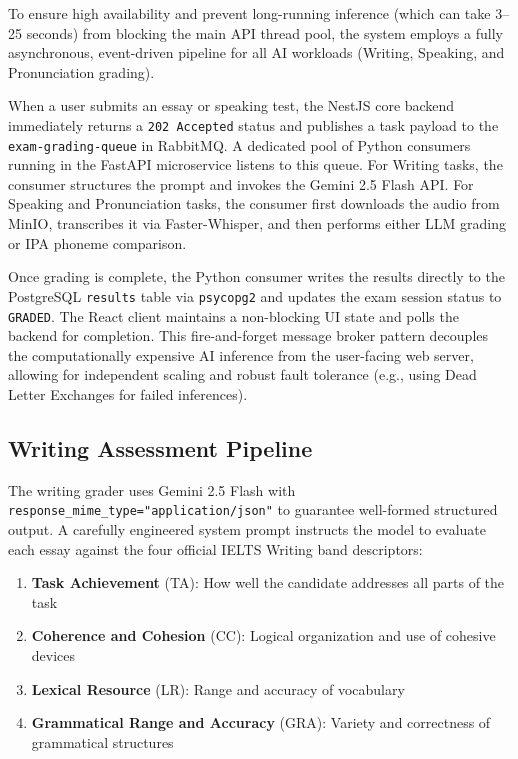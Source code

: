 \documentclass[conference]{IEEEtran}
\begin{document}
To ensure high availability and prevent long-running inference (which can take 3--25 seconds) from blocking the main API thread pool, the system employs a fully asynchronous, event-driven pipeline for all AI workloads (Writing, Speaking, and Pronunciation grading). 

When a user submits an essay or speaking test, the NestJS core backend immediately returns a \texttt{202 Accepted} status and publishes a task payload to the \texttt{exam-grading-queue} in RabbitMQ. A dedicated pool of Python consumers running in the FastAPI microservice listens to this queue. For Writing tasks, the consumer structures the prompt and invokes the Gemini 2.5 Flash API. For Speaking and Pronunciation tasks, the consumer first downloads the audio from MinIO, transcribes it via Faster-Whisper, and then performs either LLM grading or IPA phoneme comparison. 

Once grading is complete, the Python consumer writes the results directly to the PostgreSQL \texttt{results} table via \texttt{psycopg2} and updates the exam session status to \texttt{GRADED}. The React client maintains a non-blocking UI state and polls the backend for completion. This fire-and-forget message broker pattern decouples the computationally expensive AI inference from the user-facing web server, allowing for independent scaling and robust fault tolerance (e.g., using Dead Letter Exchanges for failed inferences).

\subsection{Writing Assessment Pipeline}

The writing grader uses Gemini 2.5 Flash with \texttt{response\_mime\_type="application/json"} to guarantee well-formed structured output. A carefully engineered system prompt instructs the model to evaluate each essay against the four official IELTS Writing band descriptors:

\begin{enumerate}
\item \textbf{Task Achievement} (TA): How well the candidate addresses all parts of the task
\item \textbf{Coherence and Cohesion} (CC): Logical organization and use of cohesive devices
\item \textbf{Lexical Resource} (LR): Range and accuracy of vocabulary
\item \textbf{Grammatical Range and Accuracy} (GRA): Variety and correctness of grammatical structures
\end{enumerate}
\end{document}
